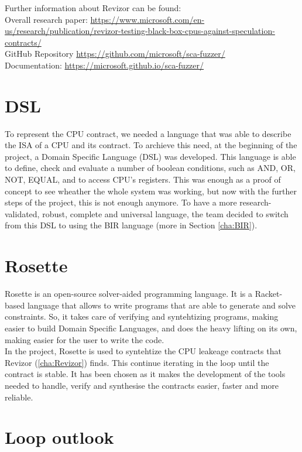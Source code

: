 Further information about Revizor can be found: \\ Overall research paper:
\url{https://www.microsoft.com/en-us/research/publication/revizor-testing-black-box-cpus-against-speculation-contracts/}
\\ GitHub Repository \url{https://github.com/microsoft/sca-fuzzer/} \\Documentation:
\url{https://microsoft.github.io/sca-fuzzer/}

\section{DSL}
\label{cha:DSL} To represent the CPU contract, we needed a language that was
able to describe the ISA of a CPU and its contract. To archieve this need, at
the beginning of the project, a Domain Specific Language (DSL) was developed.
This language is able to define, check and evaluate a number of boolean conditions,
such as AND, OR, NOT, EQUAL, and to access CPU's registers. This was enough as a
proof of concept to see wheather the whole system was working, but now with the
further steps of the project, this is not enough anymore. To have a more
research-validated, robust, complete and universal language, the team decided to
switch from this DSL to using the BIR language (more in Section \ref*{cha:BIR}).

\section{Rosette}
\label{cha:Rosette} Rosette is an open-source solver-aided programming language.
It is a Racket-based language that allows to write programs that are able to
generate and solve constraints. So, it takes care of verifying and syntehtizing
programs, making easier to build Domain Specific Languages, and does the heavy
lifting on its own, making easier for the user to write the code. \\

In the project, Rosette is used to syntehtize the CPU leakeage contracts that
Revizor (\ref*{cha:Revizor}) finds. This continue iterating in the loop until the
contract is stable. It has been chosen as it makes the development of the tools
needed to handle, verify and synthesise the contracts easier, faster and more
reliable. \\

\section{Loop outlook}
\label{cha: Loop outlook}

